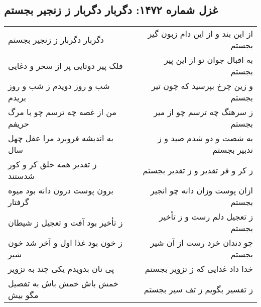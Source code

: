 \begin{center}
\section*{غزل شماره ۱۴۷۲: دگربار دگربار ز زنجیر بجستم}
\label{sec:1472}
\begin{longtable}{l p{0.5cm} r}
دگربار دگربار ز زنجیر بجستم
&&
از این بند و از این دام زبون گیر بجستم
\\
فلک پیر دوتایی پر از سحر و دغایی
&&
به اقبال جوان تو از این پیر بجستم
\\
شب و روز دویدم ز شب و روز بریدم
&&
و زین چرخ بپرسید که چون تیر بجستم
\\
من از غصه چه ترسم چو با مرگ حریفم
&&
ز سرهنگ چه ترسم چو از میر بجستم
\\
به اندیشه فروبرد مرا عقل چهل سال
&&
به شصت و دو شدم صید و ز تدبیر بجستم
\\
ز تقدیر همه خلق کر و کور شدستند
&&
ز کر و فر تقدیر و ز تقدیر بجستم
\\
برون پوست درون دانه بود میوه گرفتار
&&
ازان پوست وزان دانه چو انجیر بجستم
\\
ز تأخیر بود آفت و تعجیل ز شیطان
&&
ز تعجیل دلم رست و ز تأخیر بجستم
\\
ز خون بود غذا اول و آخر شد خون شیر
&&
چو دندان خرد رست از آن شیر بجستم
\\
پی نان بدویدم یکی چند به تزویر
&&
خدا داد غذایی که ز تزویر بجستم
\\
خمش باش خمش باش به تفصیل مگو بیش
&&
ز تفسیر بگویم ز تف سیر بجستم
\\
\end{longtable}
\end{center}
